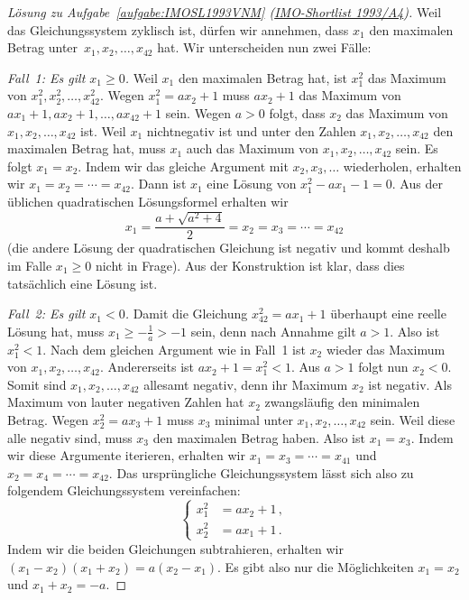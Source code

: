 \begin{proof}[Lösung zu Aufgabe~\ref{aufgabe:IMOSL1993VNM} \textmd{(\href{https://artofproblemsolving.com/community/c3944_1993_imo_shortlist}{IMO-Shortlist 1993/A4})}]
	Weil das Gleichungssystem zyklisch ist, dürfen wir annehmen, dass $x_1$ den maximalen Betrag unter~$x_1,x_2,\dotsc,x_{42}$ hat. Wir unterscheiden nun zwei Fälle:
	
	\emph{Fall~1: Es gilt $x_1\geqslant 0$.} Weil $x_1$ den maximalen Betrag hat, ist $x_1^2$ das Maximum von $x_1^2,x_2^2,\dotsc,x_{42}^2$. Wegen $x_1^2=ax_2+1$ muss $ax_2+1$ das Maximum von $ax_1+1,ax_2+1,\dotsc,ax_{42}+1$ sein. Wegen $a>0$ folgt, dass $x_2$ das Maximum von $x_1,x_2,\dotsc,x_{42}$ ist. Weil $x_1$ nichtnegativ ist und unter den Zahlen $x_1,x_2,\dotsc,x_{42}$ den maximalen Betrag hat, muss $x_1$ auch das Maximum von $x_1,x_2,\dotsc,x_{42}$ sein. Es folgt $x_1=x_2$. Indem wir das gleiche Argument mit $x_2,x_3,\dotsc$ wiederholen, erhalten wir $x_1=x_2=\dotsb=x_{42}$. Dann ist $x_1$ eine Lösung von $x_1^2-ax_1-1=0$. Aus der üblichen quadratischen Lösungsformel erhalten wir
	\begin{equation*}
		x_1=\frac{a+\sqrt{a^2+4}}2=x_2=x_3=\dotsb=x_{42}
	\end{equation*}
	(die andere Lösung der quadratischen Gleichung ist negativ und kommt deshalb im Falle $x_1\geqslant 0$ nicht in Frage). Aus der Konstruktion ist klar, dass dies tatsächlich eine Lösung ist.
	
	\emph{Fall~2: Es gilt $x_1<0$.} Damit die Gleichung $x_{42}^2=ax_1+1$ überhaupt eine reelle Lösung hat, muss $x_1\geqslant -\frac 1a>-1$ sein, denn nach Annahme gilt $a>1$. Also ist $x_1^2<1$. Nach dem gleichen Argument wie in Fall~1 ist $x_2$ wieder das Maximum von $x_1,x_2,\dotsc,x_{42}$. Andererseits ist $ax_2+1=x_1^2<1$. Aus $a>1$ folgt nun $x_2<0$. Somit sind $x_1,x_2,\dotsc,x_{42}$ allesamt negativ, denn ihr Maximum $x_2$ ist negativ. Als Maximum von lauter negativen Zahlen hat $x_2$ zwangsläufig den minimalen Betrag. Wegen $x_2^2=ax_3+1$ muss $x_3$ minimal unter $x_1,x_2,\dotsc,x_{42}$ sein. Weil diese alle negativ sind, muss $x_3$ den maximalen Betrag haben. Also ist $x_1=x_3$. Indem wir diese Argumente iterieren, erhalten wir $x_1=x_3=\dotsb=x_{41}$ und $x_2=x_4=\dotsb=x_{42}$. Das ursprüngliche Gleichungssystem lässt sich also zu folgendem Gleichungssystem vereinfachen:
	\begin{equation*}
		\left\{\begin{aligned}
			x_1^2&=ax_2+1\,,\\
			x_2^2&=ax_1+1\,.
		\end{aligned}\right.
	\end{equation*}
	Indem wir die beiden Gleichungen subtrahieren, erhalten wir $(x_1-x_2)(x_1+x_2)=a(x_2-x_1)$. Es gibt also nur die Möglichkeiten $x_1=x_2$ und $x_1+x_2=-a$. 
	

\end{proof}
